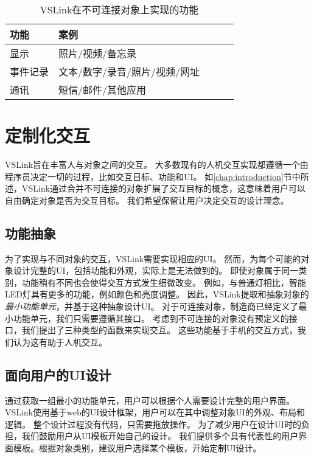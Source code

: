 \begin{table}  
	\small  
	\caption{VSLink在不可连接对象上实现的功能}  
	\begin{center}  
		\begin{tabular}{|l|l|l|l| p{4cm}|}  
			\hline  
			\textbf{功能} & \textbf{案例} \\ \hline  
			显示 & 照片/视频/备忘录   \\ \hline 
			事件记录 & 文本/数字/录音/照片/视频/网址   \\ \hline 
			通讯 & 短信/邮件/其他应用   \\ \hline  
		\end{tabular}  
	\end{center}  
\end{table}\label{table:functions}  


\chapter{定制化交互}\label{chap:flexible}
VSLink旨在丰富人与对象之间的交互。
大多数现有的人机交互实现都遵循一个由程序员决定一切的过程，比如交互目标、功能和UI。
如\ref{chap:introduction}节中所述，VSLink通过合并不可连接的对象扩展了交互目标的概念，这意味着用户可以自由确定对象是否为交互目标。
我们希望保留让用户决定交互的设计理念。
\section{功能抽象}
为了实现与不同对象的交互，VSLink需要实现相应的UI。
然而，为每个可能的对象设计完整的UI，包括功能和外观，实际上是无法做到的。
即使对象属于同一类别，功能稍有不同也会使得交互方式发生细微改变。
例如，与普通灯相比，智能LED灯具有更多的功能，例如颜色和亮度调整。
因此，VSLink提取和抽象对象的\textit{最小功能单元}，并基于这种抽象设计UI。
对于可连接对象，制造商已经定义了最小功能单元，我们只需要遵循其接口。
考虑到不可连接的对象没有预定义的接口，我们提出了三种类型的函数来实现交互。
这些功能基于手机的交互方式，我们认为这有助于人机交互。

% 
 
\section{面向用户的UI设计}
通过获取一组最小的功能单元，用户可以根据个人需要设计完整的用户界面。
VSLink使用基于web的UI设计框架，用户可以在其中调整对象UI的外观、布局和逻辑。
整个设计过程没有代码，只需要拖放操作。
为了减少用户在设计UI时的负担，我们鼓励用户从UI模板开始自己的设计。
我们提供多个具有代表性的用户界面模板。根据对象类别，建议用户选择某个模板，开始定制UI设计。

